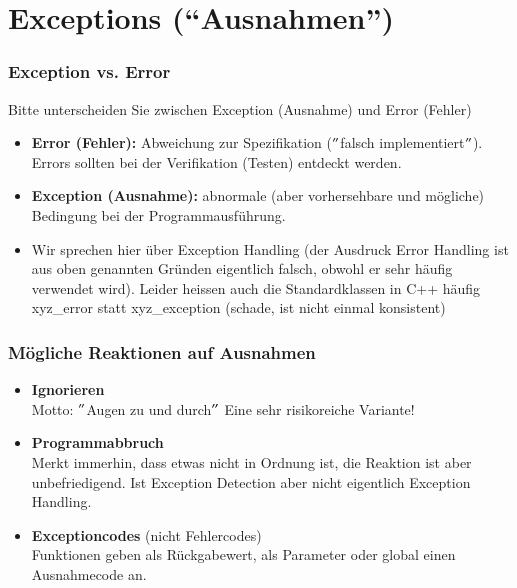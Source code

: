 
\part{Exceptions ("`Ausnahmen"')}

\section{Exception vs. Error}
Bitte unterscheiden Sie zwischen Exception (Ausnahme) und Error (Fehler)\\
\begin{itemize}
	\item \textbf{Error (Fehler):} Abweichung zur Spezifikation ($"$falsch implementiert$"$). Errors sollten bei der Verifikation (Testen) entdeckt werden.
	\item \textbf{Exception (Ausnahme):} abnormale (aber vorhersehbare und mögliche) Bedingung bei der Programmausführung.
	\item Wir sprechen hier über Exception Handling (der Ausdruck Error Handling ist aus oben genannten Gründen eigentlich falsch, obwohl er sehr häufig verwendet wird). Leider heissen auch die Standardklassen in C++ häufig xyz\_error statt xyz\_exception (schade, ist nicht einmal konsistent)
\end{itemize}

\section{Mögliche Reaktionen auf Ausnahmen}
\begin{itemize}
	\item \textbf{Ignorieren}\\
		Motto: $"$Augen zu und durch$"$ Eine sehr risikoreiche Variante!
	\item \textbf{Programmabbruch}\\
		Merkt immerhin, dass etwas nicht in Ordnung ist, die Reaktion ist aber unbefriedigend. Ist Exception Detection aber nicht eigentlich Exception Handling.
	\item \textbf{Exceptioncodes} (nicht Fehlercodes)\\
		Funktionen geben als Rückgabewert, als Parameter oder global einen Ausnahmecode an.
\end{itemize}

